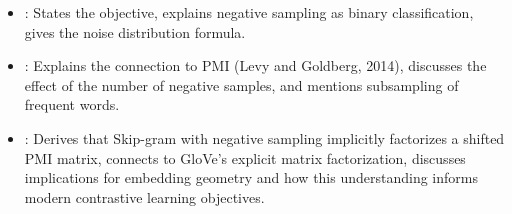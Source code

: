 \begin{interviewq}
\goodgreat
\begin{itemize}
    \item {}: States the objective, explains negative sampling as
    binary classification, gives the noise distribution formula.
    \item {}: Explains the connection to PMI (Levy and Goldberg,
    2014), discusses the effect of the number of negative samples, and
    mentions subsampling of frequent words.
    \item {}: Derives that Skip-gram with negative sampling
    implicitly factorizes a shifted PMI matrix, connects to GloVe's
    explicit matrix factorization, discusses implications for embedding
    geometry and how this understanding informs modern contrastive learning
    objectives.
\end{itemize}

\end{interviewq}

\vspace{0.5em}

